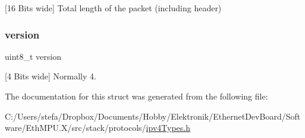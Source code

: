 \mbox{[}16 Bits wide\mbox{]} Total length of the packet (including header) 

\mbox{\label{structipv4__header__t_ab22abc2906422da61885ac6c8e6a1a59}} 
\subsubsection{\texorpdfstring{version}{version}}
{\footnotesize\ttfamily uint8\+\_\+t version}



\mbox{[}4 Bits wide\mbox{]} Normally 4. 



The documentation for this struct was generated from the following file\+:\begin{DoxyCompactItemize}
\item 
C\+:/\+Users/stefa/\+Dropbox/\+Documents/\+Hobby/\+Elektronik/\+Ethernet\+Dev\+Board/\+Software/\+Eth\+M\+P\+U.\+X/src/stack/protocols/\mbox{\hyperlink{ipv4_types_8h}{ipv4\+Types.\+h}}\end{DoxyCompactItemize}
